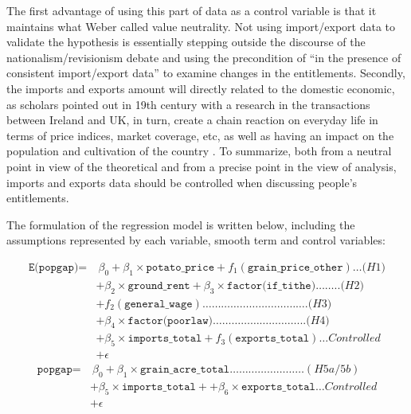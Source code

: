 The first advantage of using this part of data as a control variable is that it maintains what Weber called value neutrality. Not using import/export data to validate the hypothesis is essentially stepping outside the discourse of the nationalism/revisionism debate and using the precondition of ``in the presence of consistent import/export data'' to examine changes in the entitlements. Secondly, the imports and exports amount will directly related to the domestic economic, as scholars \citep{hansard1840flour} pointed out in 19th century with a research in the transactions between Ireland and UK, in turn, create a chain reaction on everyday life in terms of price indices, market coverage, etc, as well as having an impact on the population and cultivation of the country \citep{solar2015ireland}. To summarize, both from a neutral point in view of the theoretical and from a precise point in the view of analysis, imports and exports data should be controlled when discussing people's entitlements.

The formulation of the regression model is written below, including the assumptions represented by each variable, smooth term and control variables:

\vspace{-14pt}
\begin{align*}
\texttt{E(popgap)} = & \ \beta_0 + \beta_1 \times \texttt{potato\_price} + f_1(\texttt{grain\_price\_other}) \ldots \textit{(H1)} \\
                & + \beta_2 \times \texttt{ground\_rent} + \beta_3 \times \texttt{factor(if\_tithe)} \ldots \ldots .. \textit{(H2)} \\
                & + f_2(\texttt{general\_wage}) \ldots \ldots \ldots \ldots \ldots \ldots \ldots \ldots \ldots \ldots \ldots . \textit{(H3)} \\
                & + \beta_4 \times \texttt{factor(poorlaw)} \ldots \ldots \ldots \ldots \ldots \ldots \ldots \ldots \ldots . .. \textit{(H4)} \\
                & + \beta_5 \times \texttt{imports\_total} + f_3(\texttt{exports\_total}) \ldots Controlled\\
                & + \epsilon
\end{align*}
\vspace{-2cm}
\begin{align*}
\texttt{popgap} = & \ \beta_0 + \beta_1 \times \texttt{grain\_acre\_total}  \ldots \ldots \ldots  \ldots \ldots \ldots \ldots \ldots (\textit{H5a/5b}) \\
& + \beta_5 \times \texttt{imports\_total} + + \beta_6 \times \texttt{exports\_total} \ldots Controlled\\
& + \epsilon
\end{align*}

